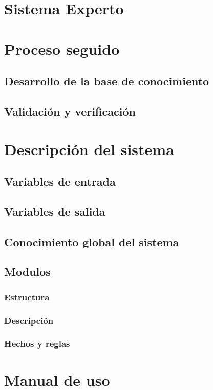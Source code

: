 \chapter{Sistema Experto}


\chapter{Proceso seguido}
\section{Desarrollo de la base de conocimiento}
\section{Validación y verificación}

\chapter{Descripción del sistema}
\section{Variables de entrada}
\section{Variables de salida}
\section{Conocimiento global del sistema}
\section{Modulos}
\subsection{Estructura}
\subsection{Descripción}
\subsection{Hechos y reglas}

\chapter{Manual de uso}
